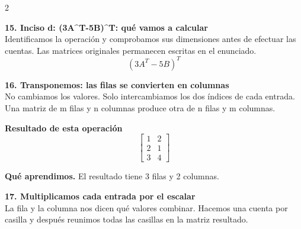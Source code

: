 \documentclass[11pt,a4paper,landscape]{article}
\begin{document}
\begin{multicols*}{2}
\begin{minipage}{\linewidth}
\end{minipage}\par\medskip
\noindent\begin{minipage}{\linewidth}\textbf{15. Inciso d: (3A\textasciicircum{}T-5B)\textasciicircum{}T: qué vamos a calcular}\\[2pt]Identificamos la operación y comprobamos sus dimensiones antes de efectuar las cuentas. Las matrices originales permanecen escritas en el enunciado.
\[(3A^T-5B)^T\]
\end{minipage}\par\medskip
\noindent\begin{minipage}{\linewidth}\textbf{16. Transponemos: las filas se convierten en columnas}\\[2pt]No cambiamos los valores. Solo intercambiamos los dos índices de cada entrada. Una matriz de m filas y n columnas produce otra de n filas y m columnas.
\par{}\par\smallskip
\par\smallskip \textbf{Resultado de esta operación}\[\begin{bmatrix}1 & 2\\2 & 1\\3 & 4\end{bmatrix}\]
\par\smallskip\textbf{Qué aprendimos.} El resultado tiene 3 filas y 2 columnas.
\end{minipage}\par\medskip
\noindent\begin{minipage}{\linewidth}\textbf{17. Multiplicamos cada entrada por el escalar}\\[2pt]La fila y la columna nos dicen qué valores combinar. Hacemos una cuenta por casilla y después reunimos todas las casillas en la matriz resultado.

\end{minipage}
\end{multicols*}
\end{document}
